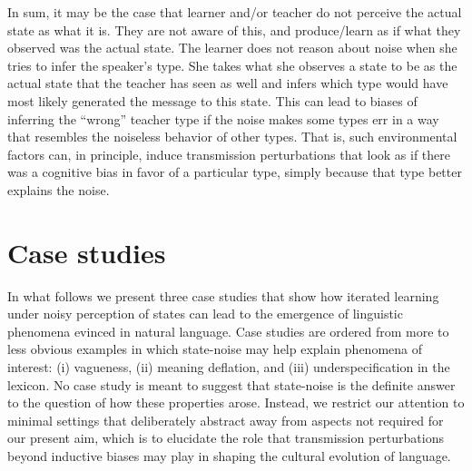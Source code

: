 \documentclass[10pt,a4paper]{article}
\newcommand{\citeposs}[2][]{\citeauthor{#2}'s (\citeyear[#1]{#2})}
\begin{document}
In sum, it may be the case that learner and/or teacher do not perceive the actual state as what
it is. They are not aware of this, and produce/learn as if what they observed was the actual
state. The learner does not reason about noise when she tries to infer the
speaker's type. She takes what she observes a state to be as the actual state that the teacher
has seen as well and infers which type would have most likely generated the message to this
state. This can lead to biases of inferring the ``wrong'' teacher type if the noise makes some
types err in a way that resembles the noiseless behavior of other types. That is, such
environmental factors can, in principle, induce transmission perturbations that look as if there was a
cognitive bias in favor of a particular type, simply because that type better explains the
noise.


\section{Case studies}

In what follows we present three case studies that show how iterated learning under noisy
perception of states can lead to the emergence of linguistic phenomena evinced in natural
language. Case studies are ordered from more to less obvious examples in which state-noise may
help explain phenomena of interest: (i) vagueness, (ii) meaning deflation, and (iii)
underspecification in the lexicon.
No case study is meant to suggest that state-noise is the definite answer to the question of
how these properties arose. Instead, we restrict our attention to minimal settings that
deliberately abstract away from aspects not required for our present aim, which is to elucidate
the role that transmission perturbations beyond inductive biases may play in shaping the
cultural evolution of language.
\end{document}
